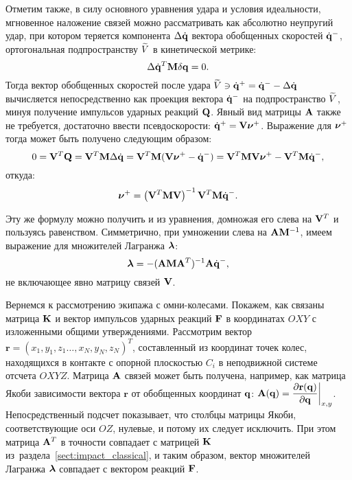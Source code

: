 Отметим также, в силу основного уравнения удара и условия идеальности, мгновенное наложение связей можно рассматривать как абсолютно неупругий удар, при котором теряется компонента $\Delta\dot{\mathbf{q}}$ вектора обобщенных скоростей $\dot{\mathbf{q}}^-$, ортогональная подпространству $\widetilde{V}$ в кинетической метрике:
\begin{equation*}
    \Delta\dot{\mathbf{q}}^T\mathbf{M}\delta\mathbf{q} = 0.
\end{equation*}
Тогда вектор обобщенных скоростей после удара $\widetilde{V} \ni \dot{\mathbf{q}}^+ = \dot{\mathbf{q}}^- - \Delta\dot{\mathbf{q}}$ вычисляется непосредственно как проекция вектора $\dot{\mathbf{q}}^-$ на подпространство $\widetilde{V}$, минуя получение импульсов ударных реакций $\mathbf{Q}$. Явный вид матрицы $\mathbf{A}$ также не требуется, достаточно ввести псевдоскорости: $\dot{\mathbf{q}}^+ = \mathbf{V}\boldsymbol{\mathbf{\nu}}^+$.
Выражение для $\boldsymbol{\mathbf{\nu}}^+$ тогда может быть получено следующим образом:
\begin{equation*}
    0 = \mathbf{V}^T\mathbf{Q} = \mathbf{V}^T\mathbf{M}\Delta\dot{\mathbf{q}} = \mathbf{V}^T\mathbf{M}(\mathbf{V}\boldsymbol{\mathbf{\nu}}^+ - \dot{\mathbf{q}}^-) = \mathbf{V}^T\mathbf{M}\mathbf{V}\boldsymbol{\mathbf{\nu}}^+ - \mathbf{V}^T\mathbf{M}\dot{\mathbf{q}}^-,
\end{equation*}
откуда:
\begin{equation*}
\boldsymbol{\mathbf{\nu}}^+ = \left( \mathbf{V}^T\mathbf{M}\mathbf{V} \right)^{-1}\mathbf{V}^T\mathbf{M}\dot{\mathbf{q}}^-.
\end{equation*}

Эту же формулу можно получить и из уравнения, домножая его слева на $\mathbf{V}^T$ и пользуясь равенством. Симметрично, при умножении слева на $\mathbf{A}\mathbf{M}^{-1}$, имеем выражение для множителей Лагранжа $\boldsymbol{\mathbf{\lambda}}$:
\begin{equation*}
    \boldsymbol{\mathbf{\lambda}} = -(\mathbf{A} \mathbf{M} \mathbf{A}^T)^{-1}\mathbf{A}\dot{\mathbf{q}}^-,
\end{equation*}
не включающее явно матрицу связей $\mathbf{V}$.

Вернемся к рассмотрению экипажа с омни-колесами. Покажем, как связаны матрица $\mathbf{K}$ и вектор импульсов ударных реакций $\mathbf{F}$ в координатах $OXY$ с изложенными общими утверждениями.
Рассмотрим вектор $\mathbf{r} = ( x_1, y_1, z_1 \ldots, x_N, y_N, z_N )^T$, составленный из координат точек колес, находящихся в контакте с опорной плоскостью $C_i$ в неподвижной системе отсчета $OXYZ$.
Матрица $\mathbf{A}$ связей может быть получена, например, как матрица Якоби зависимости вектора $\mathbf{r}$ от обобщенных координат $\mathbf{q}$: $\mathbf{A}(\mathbf{q}) = \displaystyle\frac{\displaystyle \partial \mathbf{r}(\mathbf{q})}{\displaystyle \partial \mathbf{q}}\bigg|_{x,y}$.
Непосредственный подсчет показывает, что столбцы матрицы Якоби, соответствующие оси $OZ$, нулевые, и потому их следует исключить.
При этом матрица $\mathbf{A}^T$ в точности совпадает с матрицей $\mathbf{K}$ из~раздела~\ref{sect:impact_classical}, и таким образом, вектор множителей Лагранжа $\boldsymbol{\mathbf{\lambda}}$ совпадает с вектором реакций $\mathbf{F}$.

